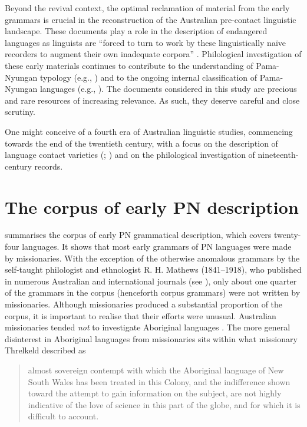 Beyond the revival context, the optimal reclamation of material from the early grammars is crucial in the reconstruction of the Australian pre-contact linguistic landscape. These documents play a role in the description of endangered languages as linguists are “forced to turn to work by these linguistically naïve recorders to augment their own inadequate corpora” \citep[445]{mcgregor_early_2000}. Philological investigation of these early materials continues to contribute to the understanding of Pama-Nyungan typology (e.g., \citealt{dixon_australian_2002}) and to the ongoing internal classification of Pama-Nyungan languages (e.g., \citealt{bowern_computational_2012}). The documents considered in this study are precious and rare resources of increasing relevance. As such, they deserve careful and close scrutiny. 

One might conceive of a fourth era of Australian linguistic studies, commencing towards the end of the twentieth century, with a focus on the description of language contact varieties (\citealt[365--366]{meakins_2014}; \citealt{dickson_inpress}) and on the philological investigation of nineteenth-century records.

\section{The corpus of early PN description}
\label{sec:key:1.1}

 summarises the corpus of early PN grammatical description, which covers twenty-four languages. It shows that most early grammars of PN languages were made by missionaries. With the exception of the otherwise anomalous grammars by the self-taught philologist and ethnologist R. H. Mathews (1841--1918), who published in numerous Australian and international journals (see \citealt{koch_r_2008}), only about one quarter of the grammars in the corpus (henceforth corpus grammars) were not written by missionaries. Although missionaries produced a substantial proportion of the corpus, it is important to realise that their efforts were unusual. Australian missionaries tended \textit{not} to investigate Aboriginal languages \citep[805]{harris_one_1994}. The more general disinterest in Aboriginal languages from missionaries sits within what missionary Threlkeld described as
\begin{quote}
    almost sovereign contempt with which the Aboriginal language of New South Wales has been treated in this Colony, and the indifference shown toward the attempt to gain information on the subject, are not highly indicative of the love of science in this part of the globe, and for which it is difficult to account. \citep[10]{threlkeld_key_1850}
 \end{quote}

